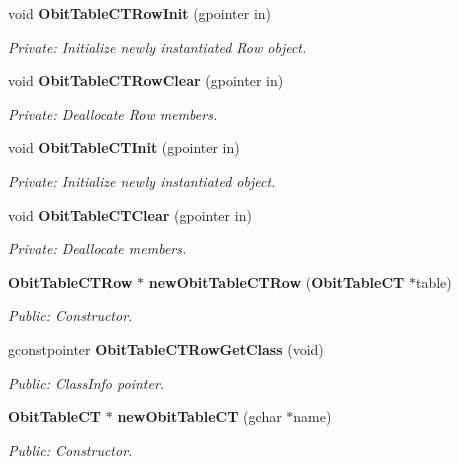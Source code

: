 \begin{CompactItemize}
\item 
void {\bf Obit\-Table\-CTRow\-Init} (gpointer in)
\begin{CompactList}\small\item\em Private: Initialize newly instantiated Row object. \item\end{CompactList}\item 
void {\bf Obit\-Table\-CTRow\-Clear} (gpointer in)
\begin{CompactList}\small\item\em Private: Deallocate Row members. \item\end{CompactList}\item 
void {\bf Obit\-Table\-CTInit} (gpointer in)
\begin{CompactList}\small\item\em Private: Initialize newly instantiated object. \item\end{CompactList}\item 
void {\bf Obit\-Table\-CTClear} (gpointer in)
\begin{CompactList}\small\item\em Private: Deallocate members. \item\end{CompactList}\item 
{\bf Obit\-Table\-CTRow} $\ast$ {\bf new\-Obit\-Table\-CTRow} ({\bf Obit\-Table\-CT} $\ast$table)
\begin{CompactList}\small\item\em Public: Constructor. \item\end{CompactList}\item 
gconstpointer {\bf Obit\-Table\-CTRow\-Get\-Class} (void)
\begin{CompactList}\small\item\em Public: Class\-Info pointer. \item\end{CompactList}\item 
{\bf Obit\-Table\-CT} $\ast$ {\bf new\-Obit\-Table\-CT} (gchar $\ast$name)
\begin{CompactList}\small\item\em Public: Constructor. \item\end{CompactList}\item 

\end{CompactItemize}
